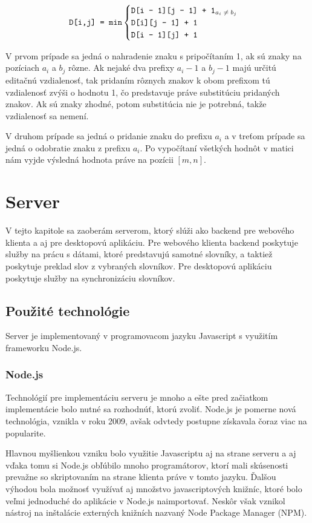 \documentclass[
  digital, %
  table,   %
  lof,     %
  lot,     %
]{fithesis3}
\begin{document}
 \begin{equation}
 \texttt{D[i,j] = min}\begin{cases}
       \texttt{D[i - 1][j - 1] + 1\textsubscript{$a_i \neq b_j$}} \\
       \texttt{D[i][j - 1] + 1} \\
       \texttt{D[i - 1][j] + 1}
       \end{cases}
 \end{equation}

V prvom prípade sa jedná o nahradenie znaku s pripočítaním 1, ak sú znaky na pozíciach $a_i$ a $b_j$ rôzne. Ak nejaké dva prefixy $a_i-1$ a $b_j-1$ majú určitú editačnú vzdialenosť, tak pridaním rôznych znakov k obom prefixom tú vzdialenosť zvýši o hodnotu 1, čo predstavuje práve substitúciu pridaných znakov. Ak sú znaky zhodné, potom substitúcia nie je potrebná, takže vzdialenosť sa nemení. 

V druhom prípade sa jedná o pridanie znaku do prefixu $a_i$ a v treťom prípade sa jedná o odobratie znaku z prefixu $a_i$. Po vypočítaní všetkých hodnôt v matici nám vyjde výsledná hodnota práve na pozícii $[m,n]$.



\chapter{Server}
V tejto kapitole sa zaoberám serverom, ktorý slúži ako backend pre webového klienta a aj pre desktopovú aplikáciu. Pre webového klienta backend poskytuje služby na prácu s dátami, ktoré predstavujú samotné slovníky, a taktiež poskytuje preklad slov z vybraných slovníkov. Pre desktopovú aplikáciu poskytuje služby na synchronizáciu slovníkov.

\section{Použité technológie}
Server je implementovaný v programovacom jazyku Javascript s využitím frameworku Node.js.

\subsection{Node.js}
Technológií pre implementáciu serveru je mnoho a ešte pred začiatkom implementácie bolo nutné sa rozhodnúť, ktorú zvoliť. Node.js je pomerne nová technológia, vznikla v roku 2009, avšak odvtedy postupne získavala čoraz viac na popularite.

Hlavnou myšlienkou vzniku bolo využitie Javascriptu aj na strane serveru a aj vďaka tomu si Node.js obľúbilo mnoho programátorov, ktorí mali skúsenosti prevažne so skriptovaním na strane klienta práve v tomto jazyku. Ďalšou výhodou bola možnosť využívať aj množstvo javascriptových knižníc, ktoré bolo veľmi jednoduché do aplikácie v Node.js naimportovať. Neskôr však vznikol nástroj na inštalácie externých knižních nazvaný Node Package Manager (NPM).
\end{document}
